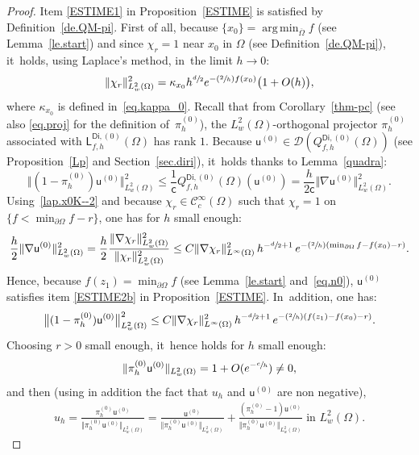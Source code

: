 \documentclass[JEP,XML,SOM,Unicode,NoEqCountersInSection,NoFloatCountersInSection,published]{cedram}
\newcommand{\Psfrac}[2]{(\sfrac{#1}{#2})}
\DeclareMathOperator*{\argmin}{arg\,min}
\theoremstyle{plain}
\theoremstyle{definition}
\begin{document}
\begin{proof} Item \eqref{ESTIME1} in Proposition~\ref{ESTIME} is satisfied by Definition~\ref{de.QM-pi}.
First of all, because $\{x_0\}= \argmin_{\overline \Omega} f$ (see Lemma~\ref{le.start}) and since $\chi_r=1$ near $x_0$ in $\Omega$ (see Definition~\ref{de.QM-pi}), it~holds, using Laplace's method, in~the limit $h\to 0$:
\begin{equation}\label{lap.x0K--2}
\Vert \chi_r\Vert_{L^2_w(\Omega)}^2= \kappa_{x_0} h^{\sfrac d2} e^{-\Psfrac 2h f(x_0)} \bigl(1+O(h)\bigr),
\end{equation}
where $\kappa_{x_0}$ is defined in~\eqref{eq.kappa_0}.
Recall that from Corollary~\ref{thm-pc} (see also \eqref{eq.proj} for the definition of~$ \pi_h^{(0)}$), the $L^2_w(\Omega)$-orthogonal projector $ \pi_h^{(0)}$ associated with $\mathsf L_{f,h}^{\mathsf{Di},(0)}(\Omega)$ has rank $1$.
Because $\mathsf u^{(0)}\in \mathcal D(Q_{f,h}^{\mathsf{Di},(0)}(\Omega))$ (see Proposition~\ref{Lp} and Section~\ref{sec.diri}), it~holds thanks to Lemma~\ref{quadra}:
\[
\big \Vert(1- \pi_h^{(0)}) \mathsf u^{(0)} \big \Vert_{L^2_w(\Omega)}^2 \le\frac{1}{\mathsf c}Q_{f,h}^{\mathsf{Di},(0)}(\Omega)(\mathsf u^{(0)})= \frac {h}{2\mathsf c} \Vert \nabla \mathsf u^{(0)} \Vert_{L^2_w(\Omega)}^2.
\]
Using~\eqref{lap.x0K--2} and because $\chi_r\in \mathcal C^\infty_c(\Omega)$ such that $\chi_r=1$ on $\{f<\min_{\partial \Omega}f-r\}$, one has for $h$ small enough:
\[
\frac h2 \Vert \nabla \mathsf u^{(0)} \Vert_{L^2_w(\Omega)}^2 = \frac h2\frac{\Vert \nabla \chi_r\Vert_{L^2_w(\Omega)}^2}{\Vert \chi_r\Vert_{L^2_w(\Omega)}^2}
\le C \Vert \nabla \chi_r \Vert_{L^\infty(\Omega)}^2 \, h^{-\sfrac d2+ 1}\, e^{-\Psfrac{2}{h} (\min_{\partial \Omega}f -f(x_0)-r)}.
\]
Hence, because $f(z_1)=\min_{\partial \Omega}f$ (see Lemma~\ref{le.start} and~\eqref{eq.n0}), $\mathsf u^{(0)}$ satisfies item \eqref{ESTIME2b} in Proposition~\ref{ESTIME}. In~addition, one has:
\[
\big \Vert(1- \pi_h^{(0)}) \mathsf u^{(0)} \big \Vert_{L^2_w(\Omega)}^2 \le C \Vert \nabla \chi_r \Vert_{L^\infty(\Omega)}^2 \, h^{-\sfrac d2+ 1}\, e^{-\Psfrac{2}{h} (f(z_1) -f(x_0)-r)}.
\]
Choosing $r>0$ small enough, it~hence holds for $h$ small enough:\vspace*{-3pt}
\[
\Vert \pi_h^{(0)}\mathsf u^{(0)} \Vert_{L^2_w(\Omega)}=1+O(e^{-\sfrac ch}) \neq 0,
\]
and then (using in addition the fact that $u_h$ and $\mathsf
u^{(0)}$ are non negative),\vspace*{-3pt}
\begin{align*}
u_{h}=\frac{\pi_h^{(0)}\mathsf u^{(0)} }{ \Vert \pi_h^{(0)}\mathsf u^{(0)} \Vert_{L^2_w(\Omega)} }= \frac{\mathsf u^{(0)}}{ \Vert \pi_h^{(0)}\mathsf u^{(0)} \Vert_{L^2_w(\Omega)}} + \frac{(\pi_h^{(0)} -1)\mathsf u^{(0)} }{ \Vert \pi_h^{(0)}\mathsf u^{(0)} \Vert_{L^2_w(\Omega)}} \text{ in } L^2_w(\Omega).

\end{align*}
\end{proof}
\end{document}
